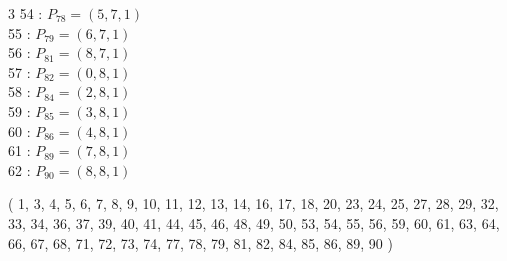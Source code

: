 \documentclass{article}
\begin{document}
{\begin{multicols}{3}
54 : $P_{78}=( 5, 7, 1 )$\\
55 : $P_{79}=( 6, 7, 1 )$\\
56 : $P_{81}=( 8, 7, 1 )$\\
57 : $P_{82}=( 0, 8, 1 )$\\
58 : $P_{84}=( 2, 8, 1 )$\\
59 : $P_{85}=( 3, 8, 1 )$\\
60 : $P_{86}=( 4, 8, 1 )$\\
61 : $P_{89}=( 7, 8, 1 )$\\
62 : $P_{90}=( 8, 8, 1 )$\\
\end{multicols}
( 1, 3, 4, 5, 6, 7, 8, 9, 10, 11, 12, 13, 14, 16, 17, 18, 20, 23, 24, 25, 27, 28, 29, 32, 33, 34, 36, 37, 39, 40, 41, 44, 45, 46, 48, 49, 50, 53, 54, 55, 56, 59, 60, 61, 63, 64, 66, 67, 68, 71, 72, 73, 74, 77, 78, 79, 81, 82, 84, 85, 86, 89, 90 )\\
}
\end{document}
